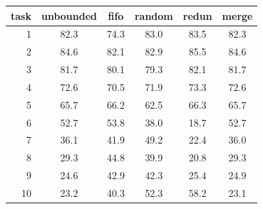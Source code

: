 \begin{tabular}{rccccc}
\toprule
task & unbounded & fifo & random & redun & merge \\
\midrule
1 & 82.3 & 74.3 & 83.0 & 83.5 & 82.3 \\
2 & 84.6 & 82.1 & 82.9 & 85.5 & 84.6 \\
3 & 81.7 & 80.1 & 79.3 & 82.1 & 81.7 \\
4 & 72.6 & 70.5 & 71.9 & 73.3 & 72.6 \\
5 & 65.7 & 66.2 & 62.5 & 66.3 & 65.7 \\
6 & 52.7 & 53.8 & 38.0 & 18.7 & 52.7 \\
7 & 36.1 & 41.9 & 49.2 & 22.4 & 36.0 \\
8 & 29.3 & 44.8 & 39.9 & 20.8 & 29.3 \\
9 & 24.6 & 42.9 & 42.3 & 25.4 & 24.9 \\
10 & 23.2 & 40.3 & 52.3 & 58.2 & 23.1 \\
\bottomrule
\end{tabular}
